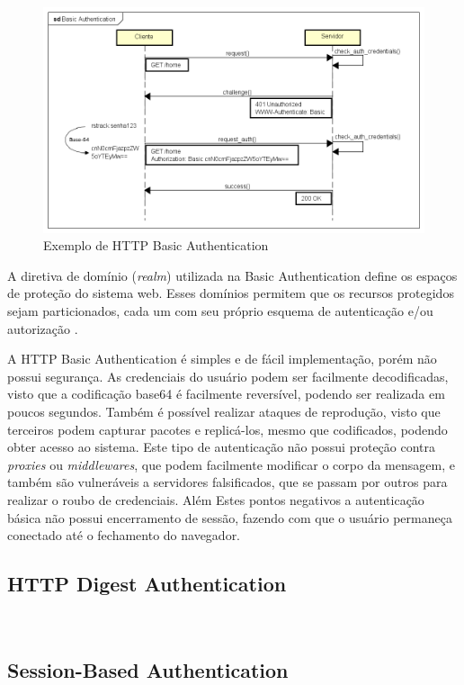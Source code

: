 \documentclass[12pt]{article}
\begin{document}
\begin{figure}[ht]
  \centering
  \includegraphics[width=1\textwidth]{Basic Authentication.png}
  \caption{Exemplo de HTTP Basic Authentication}
  \label{fig:basicAuth}
\end{figure}

A diretiva de domínio (\emph{realm}) utilizada na Basic Authentication define os espaços de proteção do sistema 
web. Esses domínios permitem que os recursos protegidos sejam particionados, cada um com seu próprio esquema de 
autenticação e/ou autorização \cite{RFC2617}.

A HTTP Basic Authentication é simples e de fácil implementação, porém não possui segurança. As credenciais do
usuário podem ser facilmente decodificadas, visto que a codificação base64 é facilmente reversível, podendo ser
realizada em poucos segundos. Também é possível realizar ataques de reprodução, visto que terceiros podem capturar
pacotes e replicá-los, mesmo que codificados, podendo obter acesso ao sistema. Este tipo de autenticação não possui
proteção contra \emph{proxies} ou \emph{middlewares}, que podem facilmente modificar o corpo da mensagem, e também
são vulneráveis a servidores falsificados, que se passam por outros para realizar o roubo de credenciais. Além Estes
pontos negativos a autenticação básica não possui encerramento de sessão, fazendo com que o usuário permaneça conectado
até o fechamento do navegador.

\subsection{HTTP Digest Authentication}
\
\subsection{Session-Based Authentication}
\
\end{document}

